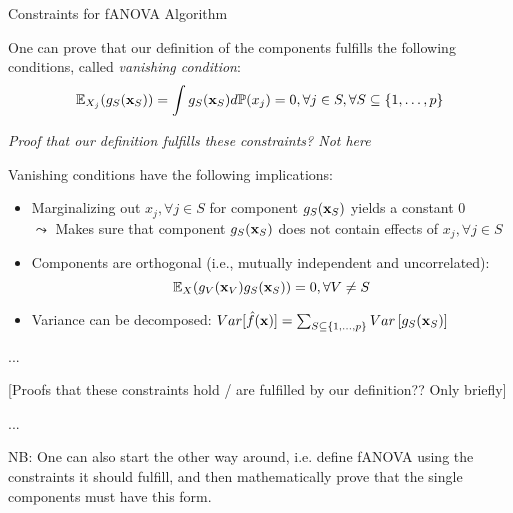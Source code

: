 \documentclass[11pt,compress,t,notes=noshow, aspectratio=169, xcolor=table]{beamer}
\begin{document}
\begin{frame}{Constraints for fANOVA Algorithm}

    One can prove that our definition of the components fulfills the following conditions, called \textit{vanishing condition}:
    \begin{equation*}
        \mathbb{E}_{X_j} (g_{S}(\mathbf{x}_S)) = \int g_{S}(\mathbf{x}_S) d \mathbb{P}(x_j) = 0, \forall j \in S, \forall S \subseteq \{1, \ldots, p\}
    \end{equation*}


    \textit{Proof that our definition fulfills these constraints? Not here}
    
    \pause 
    
    Vanishing conditions have the following implications:
    
    \begin{itemize}
        \item Marginalizing out $x_j, \forall j \in S$ for component $g_S(\mathbf{x}_S)$ yields a constant 0\\
        $\leadsto$ Makes sure that component $g_S(\mathbf{x}_S)$ does not contain effects of $x_j, \forall j \in S$
        \item Components are orthogonal (i.e., mutually independent and uncorrelated):
        $$\mathbb{E}_{X} (g_{V}(\mathbf{x}_V) g_{S}(\mathbf{x}_S)) = 0, \forall V \neq S$$
        \item Variance can be decomposed:
    $ Var[\hat{f}(\mathbf{x})] =  \textstyle\sum_{S \subseteq \{1,\ldots,p\}}  Var\left[ g_{S}(\mathbf{x}_S)\right]$
    \end{itemize}
    
\end{frame}

\begin{frame}{...}

    [Proofs that these constraints hold / are fulfilled by our definition?? Only briefly]
    
\end{frame}

\begin{frame}{...}

    NB: One can also start the other way around, i.e. define fANOVA using the constraints it should fulfill, and then mathematically prove that the single components must have this form.
    
\end{frame}










\endlecture
\end{document}
